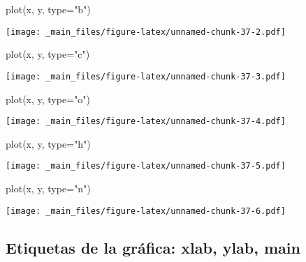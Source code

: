 \documentclass[
]{book}
\newenvironment{Shaded}{\begin{snugshade}}{\end{snugshade}}
\newcommand{\AttributeTok}[1]{\textcolor[rgb]{0.77,0.63,0.00}{#1}}
\newcommand{\FunctionTok}[1]{\textcolor[rgb]{0.00,0.00,0.00}{#1}}
\newcommand{\NormalTok}[1]{#1}
\newcommand{\StringTok}[1]{\textcolor[rgb]{0.31,0.60,0.02}{#1}}
\begin{document}
\begin{Shaded}
\begin{Highlighting}[]
\FunctionTok{plot}\NormalTok{(x, y, }\AttributeTok{type=}\StringTok{"b"}\NormalTok{)}
\end{Highlighting}
\end{Shaded}

\texttt{[image: \_main\_files/figure-latex/unnamed-chunk-37-2.pdf]}

\begin{Shaded}
\begin{Highlighting}[]
\FunctionTok{plot}\NormalTok{(x, y, }\AttributeTok{type=}\StringTok{"c"}\NormalTok{)}
\end{Highlighting}
\end{Shaded}

\texttt{[image: \_main\_files/figure-latex/unnamed-chunk-37-3.pdf]}

\begin{Shaded}
\begin{Highlighting}[]
\FunctionTok{plot}\NormalTok{(x, y, }\AttributeTok{type=}\StringTok{"o"}\NormalTok{)}
\end{Highlighting}
\end{Shaded}

\texttt{[image: \_main\_files/figure-latex/unnamed-chunk-37-4.pdf]}

\begin{Shaded}
\begin{Highlighting}[]
\FunctionTok{plot}\NormalTok{(x, y, }\AttributeTok{type=}\StringTok{"h"}\NormalTok{)}
\end{Highlighting}
\end{Shaded}

\texttt{[image: \_main\_files/figure-latex/unnamed-chunk-37-5.pdf]}

\begin{Shaded}
\begin{Highlighting}[]
\FunctionTok{plot}\NormalTok{(x, y, }\AttributeTok{type=}\StringTok{"n"}\NormalTok{)}
\end{Highlighting}
\end{Shaded}

\texttt{[image: \_main\_files/figure-latex/unnamed-chunk-37-6.pdf]}

\hypertarget{etiquetas-de-la-gruxe1fica-xlab-ylab-main}{%
\subsection{Etiquetas de la gráfica: xlab, ylab, main}\label{etiquetas-de-la-gruxe1fica-xlab-ylab-main}}
\end{document}
